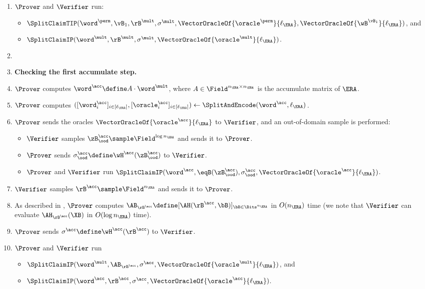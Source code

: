 \begin{tcolorbox}[breakable, enhanced, colback=white, boxrule=0.65pt]
\begin{enumerate}[nolistsep]
        \item $\Prover$ and $\Verifier$ run:
        \begin{itemize}[nolistsep]
            \item $\SplitClaimTIP(\word^{\perm}, \vB_1, \rB^{\mult}, \sigma^{\mult}, \VectorOracleOf{\oracle^{\perm}}{\ell_{\ERA}}, \VectorOracleOf{\wB^{\vB_1}}{\ell_{\ERA}})$, and
            \item $\SplitClaimIP(\word^{\mult}, \rB^{\mult}, \sigma^{\mult}, \VectorOracleOf{\oracle^{\mult}}{\ell_{\ERA}})$.
        \end{itemize}

        \item [] \item[] \textbf{Checking the first accumulate step.}
        \item $\Prover$ computes $\word^{\acc} \define A \cdot \word^{\mult}$, where $A \in \Field^{n_{\ERA} \times n_{\ERA}}$ is the accumulate matrix of $\ERA$.
        \item $\Prover$ computes $([\word^{\acc}_i]_{i \in [\ell_{\ERA}]}, [\oracle^{\acc}_i]_{i \in [\ell_{\ERA}]}) \gets \SplitAndEncode(\word^{\acc}, \ell_{\ERA})$.
        \item $\Prover$ sends the oracles $\VectorOracleOf{\oracle^{\acc}}{\ell_{\ERA}}$ to $\Verifier$, and an out-of-domain sample is performed:
        \begin{itemize}[nolistsep]
            \item $\Verifier$ samples $\zB^{\acc}_{\ood} \sample \Field^{\log n_{\ERA}}$ and sends it to $\Prover$.
            \item $\Prover$ sends $\sigma^{\acc}_{\ood} \define \wH^{\acc}(\zB^{\acc}_{\ood})$ to $\Verifier$.
            \item $\Prover$ and $\Verifier$ run $\SplitClaimIP(\word^{\acc}, \eqB(\zB^{\acc}_{\ood}), \sigma^{\acc}_{\ood}, \VectorOracleOf{\oracle^{\acc}}{\ell_{\ERA}})$.
        \end{itemize}
        \item $\Verifier$ samples $\rB^{\acc} \sample \Field^{n_{\ERA}}$ and sends it to $\Prover$.
        \item As described in \cite{BrehmCFRRZ24}, $\Prover$ computes $\AB_{\rB^{\acc}} \define [\AH(\rB^{\acc},\bB)]_{\bB \in \Bits^{n_{\ERA}}}$ in $O(n_{\ERA})$ time (we note that $\Verifier$ can evaluate $\AH_{\rB^{\acc}}(\XB)$ in $O(\log n_{\ERA})$ time).
        \item $\Prover$ sends $\sigma^\acc \define \wH^{\acc}(\rB^{\acc})$ to $\Verifier$.
        \item $\Prover$ and $\Verifier$ run
        \begin{itemize}[nolistsep]
            \item $\SplitClaimIP(\word^{\mult}, \AB_{\rB^{\acc}}, \sigma^{\acc}, \VectorOracleOf{\oracle^{\mult}}{\ell_{\ERA}})$, and
            \item $\SplitClaimIP(\word^{\acc}, \rB^{\acc}, \sigma^{\acc}, \VectorOracleOf{\oracle^{\acc}}{\ell_{\ERA}})$.
        \end{itemize}


\end{enumerate}
\end{tcolorbox}
